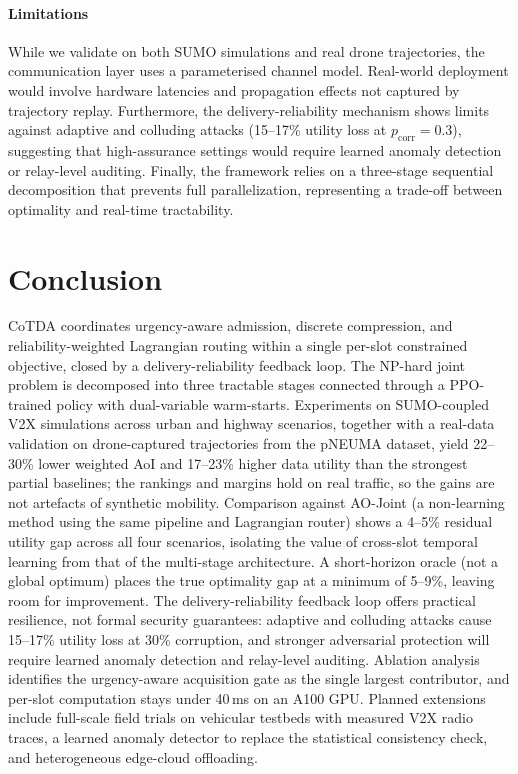 \documentclass[final,3p,times,review,sort&compress]{elsarticle}
\begin{document}
\paragraph{Limitations}
While we validate on both SUMO simulations and real drone trajectories, the communication layer uses a parameterised channel model. Real-world deployment would involve hardware latencies and propagation effects not captured by trajectory replay. Furthermore, the delivery-reliability mechanism shows limits against adaptive and colluding attacks (15--17\% utility loss at $p_{\mathrm{corr}}{=}0.3$), suggesting that high-assurance settings would require learned anomaly detection or relay-level auditing. Finally, the framework relies on a three-stage sequential decomposition that prevents full parallelization, representing a trade-off between optimality and real-time tractability.

\section{Conclusion}
\label{sec:conclusion}

CoTDA coordinates urgency-aware admission, discrete compression, and reliability-weighted Lagrangian routing within a single per-slot constrained objective, closed by a delivery-reliability feedback loop. The NP-hard joint problem is decomposed into three tractable stages connected through a PPO-trained policy with dual-variable warm-starts. Experiments on SUMO-coupled V2X simulations across urban and highway scenarios, together with a real-data validation on drone-captured trajectories from the pNEUMA dataset, yield 22--30\% lower weighted AoI and 17--23\% higher data utility than the strongest partial baselines; the rankings and margins hold on real traffic, so the gains are not artefacts of synthetic mobility. Comparison against AO-Joint (a non-learning method using the same pipeline and Lagrangian router) shows a 4--5\% residual utility gap across all four scenarios, isolating the value of cross-slot temporal learning from that of the multi-stage architecture. A short-horizon oracle (not a global optimum) places the true optimality gap at a minimum of 5--9\%, leaving room for improvement. The delivery-reliability feedback loop offers practical resilience, not formal security guarantees: adaptive and colluding attacks cause 15--17\% utility loss at 30\% corruption, and stronger adversarial protection will require learned anomaly detection and relay-level auditing. Ablation analysis identifies the urgency-aware acquisition gate as the single largest contributor, and per-slot computation stays under 40\,ms on an A100 GPU. Planned extensions include full-scale field trials on vehicular testbeds with measured V2X radio traces, a learned anomaly detector to replace the statistical consistency check, and heterogeneous edge-cloud offloading.
\end{document}
